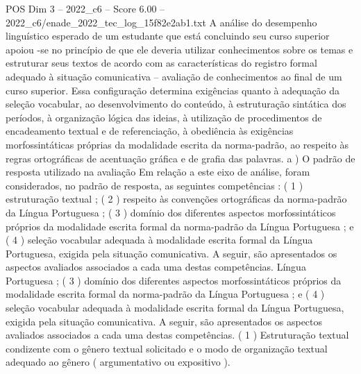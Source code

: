 \begin{textsample}{POS Dim 3 – 2022\_c6 – Score 6.00 – 2022\_c6/enade\_2022\_tec\_log\_15f82e2ab1.txt}
A análise do desempenho linguístico esperado de um estudante que está concluindo seu curso superior apoiou -se no princípio de que ele deveria utilizar conhecimentos sobre os temas e estruturar seus textos de acordo com as características do registro formal adequado à situação comunicativa – avaliação de conhecimentos ao final de um curso superior.
Essa configuração determina exigências quanto à adequação da seleção vocabular, ao desenvolvimento do conteúdo, à estruturação sintática dos períodos, à organização lógica das ideias, à utilização de procedimentos de encadeamento textual e de referenciação, à obediência às exigências morfossintáticas próprias da modalidade escrita da norma-padrão, ao respeito às regras ortográficas de acentuação gráfica e de grafia das palavras. a ) O padrão de resposta utilizado na avaliação Em relação a este eixo de análise, foram considerados, no padrão de resposta, as seguintes competências : ( 1 ) estruturação textual ; ( 2 ) respeito às convenções ortográficas da norma-padrão da Língua Portuguesa ; ( 3 ) domínio dos diferentes aspectos morfossintáticos próprios da modalidade escrita formal da norma-padrão da Língua Portuguesa ; e ( 4 ) seleção vocabular adequada à modalidade escrita formal da Língua Portuguesa, exigida pela situação comunicativa.
A seguir, são apresentados os aspectos avaliados associados a cada uma destas competências.
Língua Portuguesa ; ( 3 ) domínio dos diferentes aspectos morfossintáticos próprios da modalidade escrita formal da norma-padrão da Língua Portuguesa ; e ( 4 ) seleção vocabular adequada à modalidade escrita formal da Língua Portuguesa, exigida pela situação comunicativa.
A seguir, são apresentados os aspectos avaliados associados a cada uma destas competências. ( 1 ) Estruturação textual condizente com o gênero textual solicitado e o modo de organização textual adequado ao gênero ( argumentativo ou expositivo ).

\end{textsample}
